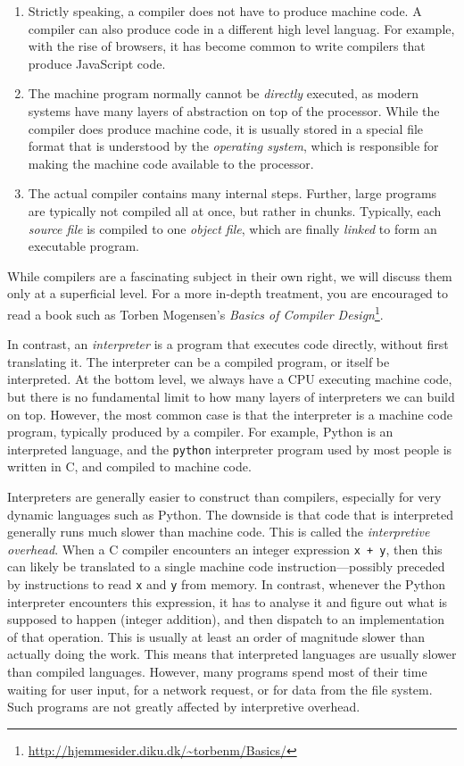 \begin{enumerate}
\item Strictly speaking, a compiler does not have to produce machine
  code.  A compiler can also produce code in a different high level
  languag.  For example, with the rise of browsers, it has become
  common to write compilers that produce JavaScript code.
\item The machine program normally cannot be \textit{directly}
  executed, as modern systems have many layers of abstraction on top
  of the processor.  While the compiler does produce machine code, it
  is usually stored in a special file format that is understood by the
  \textit{operating system}, which is responsible for making the
  machine code available to the processor.
\item The actual compiler contains many internal steps.  Further,
  large programs are typically not compiled all at once, but rather in
  chunks.  Typically, each \textit{source file} is compiled to one
  \textit{object file}, which are finally \textit{linked} to form an
  executable program.
\end{enumerate}

While compilers are a fascinating subject in their own right, we will
discuss them only at a superficial level.  For a more in-depth
treatment, you are encouraged to read a book such as Torben Mogensen's
\textit{Basics of Compiler
  Design}\footnote{\url{http://hjemmesider.diku.dk/~torbenm/Basics/}}.

In contrast, an \textit{interpreter} is a program that executes code
directly, without first translating it.  The interpreter can be a
compiled program, or itself be interpreted.  At the bottom level, we
always have a CPU executing machine code, but there is no fundamental
limit to how many layers of interpreters we can build on top.
However, the most common case is that the interpreter is a machine
code program, typically produced by a compiler.  For example, Python
is an interpreted language, and the \texttt{python} interpreter
program used by most people is written in C, and compiled to machine
code.

Interpreters are generally easier to construct than compilers,
especially for very dynamic languages such as Python.  The downside is
that code that is interpreted generally runs much slower than machine
code.  This is called the \textit{interpretive overhead}.  When a C
compiler encounters an integer expression \texttt{x + y}, then this
can likely be translated to a single machine code
instruction---possibly preceded by instructions to read \texttt{x} and
\texttt{y} from memory.  In contrast, whenever the Python interpreter
encounters this expression, it has to analyse it and figure out what
is supposed to happen (integer addition), and then dispatch to an
implementation of that operation.  This is usually at least an order
of magnitude slower than actually doing the work.  This means that
interpreted languages are usually slower than compiled languages.
However, many programs spend most of their time waiting for user
input, for a network request, or for data from the file system.  Such
programs are not greatly affected by interpretive overhead.

